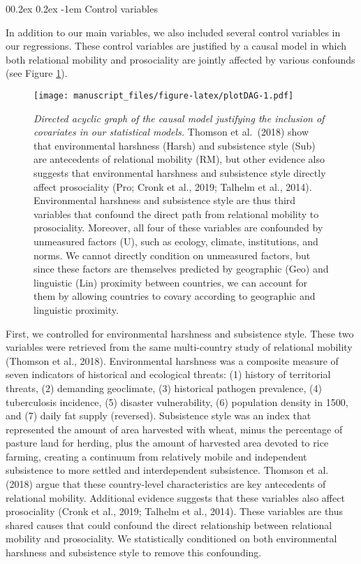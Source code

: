 \documentclass[
  man,floatsintext]{apa6}
\makeatletter
\let\oldparagraph\paragraph
\renewcommand{\paragraph}[1]{\oldparagraph{#1}\mbox{}}
\renewcommand{\paragraph}{\@startsection{paragraph}{4}{\parindent}%
  {0\baselineskip \@plus 0.2ex \@minus 0.2ex}%
  {-1em}%
  {\normalfont\normalsize\bfseries\itshape\typesectitle}}
\makeatother
\begin{document}
\hypertarget{control-variables}{%
\paragraph{Control variables}\label{control-variables}}

In addition to our main variables, we also included several control variables in our regressions. These control variables are justified by a causal model in which both relational mobility and prosociality are jointly affected by various confounds (see Figure \ref{fig:plotDAG}).



\begin{figure}
\centering
\texttt{[image: manuscript\_files/figure-latex/plotDAG-1.pdf]}
\caption{\label{fig:plotDAG}\emph{Directed acyclic graph of the causal model justifying the inclusion of covariates in our statistical models.} Thomson et al.~(2018) show that environmental harshness (Harsh) and subsistence style (Sub) are antecedents of relational mobility (RM), but other evidence also suggests that environmental harshness and subsistence style directly affect prosociality (Pro; Cronk et al., 2019; Talhelm et al., 2014). Environmental harshness and subsistence style are thus third variables that confound the direct path from relational mobility to prosociality. Moreover, all four of these variables are confounded by unmeasured factors (U), such as ecology, climate, institutions, and norms. We cannot directly condition on unmeasured factors, but since these factors are themselves predicted by geographic (Geo) and linguistic (Lin) proximity between countries, we can account for them by allowing countries to covary according to geographic and linguistic proximity.}
\end{figure}

First, we controlled for environmental harshness and subsistence style. These two variables were retrieved from the same multi-country study of relational mobility (Thomson et al., 2018). Environmental harshness was a composite measure of seven indicators of historical and ecological threats: (1) history of territorial threats, (2) demanding geoclimate, (3) historical pathogen prevalence, (4) tuberculosis incidence, (5) disaster vulnerability, (6) population density in 1500, and (7) daily fat supply (reversed). Subsistence style was an index that represented the amount of area harvested with wheat, minus the percentage of pasture land for herding, plus the amount of harvested area devoted to rice farming, creating a continuum from relatively mobile and independent subsistence to more settled and interdependent subsistence. Thomson et al. (2018) argue that these country-level characteristics are key antecedents of relational mobility. Additional evidence suggests that these variables also affect prosociality (Cronk et al., 2019; Talhelm et al., 2014). These variables are thus shared causes that could confound the direct relationship between relational mobility and prosociality. We statistically conditioned on both environmental harshness and subsistence style to remove this confounding.
\end{document}
